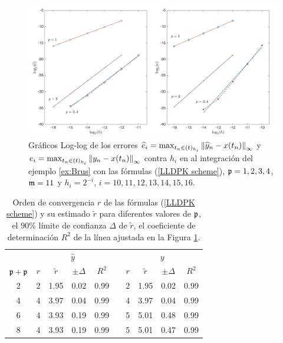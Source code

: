 \begin{figure}[htb]
	\begin{center}
		\includegraphics[scale=0.45]{Graphics/lldp/p-plots.jpg}
		\caption{Gráficos Log-log de los errores $\widehat{e}_i=\max_{t_n\in(t)_{h_i}}\left\lVert \widehat{y}_n-x(t_n) \right\rVert_\infty$ y $e_i=\max_{t_n\in(t)_{h_i}}\left\lVert y_n-x(t_n) \right\rVert_\infty$ contra $h_i$ en al integración del ejemplo \ref{ex:Brus} con las fórmulas (\ref{LLDPK scheme}), $\mathfrak{p}=1,2,3,4$, $\mathfrak{m}=11$ y $h_i=2^{-i}$, $i=10,11,12,13,14,15,16$.}
		\label{fig:num-exp-lldp-fix-step:Fig2}
	\end{center}
\end{figure}


\begin{table}[htb]
	\centering
	\caption{
		Orden de convergencia $r$ de las fórmulas (\ref{LLDPK scheme}) y su estimado  $\widetilde{r}$ para diferentes valores de $\mathfrak{p}$, el $90\%$ límite de confianza $\Delta$ de $\widetilde {r}$, el coeficiente de determinación $R^2$ de la línea ajustada en la Figura \ref{fig:num-exp-lldp-fix-step:Fig2}.}
		\begin{tabular}{ c  c c c c  c  c c c c}
			\hline
			& \multicolumn{4}{c}{$\widehat{y}$} & & \multicolumn{4}{c}{$y$} \\
			\cline{2-5} \cline{7-10}
			$\mathfrak{p}+\mathfrak{p}$ & $r$ & $\widetilde{r}$ & $\pm\varDelta$ & $R^2$ & & $r$ & $\widetilde{r}$ & $\pm\varDelta$ & $R^2$ \\
			\hline
			2 & 2 & 1.95 & 0.02 & 0.99 & & 2 & 1.95 & 0.02 & 0.99 \\
			4 & 4 & 3.97 & 0.04 & 0.99 & & 4 & 3.97 & 0.04 & 0.99 \\
			6 & 4 & 3.93 & 0.19 & 0.99 & & 5 & 5.01 & 0.48 & 0.99 \\
			8 & 4 & 3.93 & 0.19 & 0.99 & & 5 & 5.01 & 0.47 & 0.99 \\
			\hline
		\end{tabular}
	\label{tab:num-exp-lldp-fix-step:porders}
\end{table}

